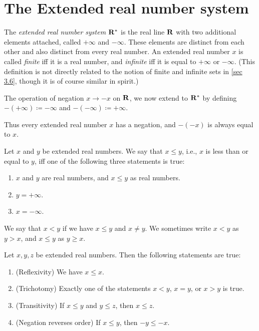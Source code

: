 \section{The Extended real number system}\label{sec 6.2}

\begin{definition}\label{6.2.1}
  The \emph{extended real number system \(\mathbf{R}^*\)} is the real line \(\mathbf{R}\) with two additional elements attached, called \(+\infty\) and \(-\infty\).
  These elements are distinct from each other and also distinct from every real number.
  An extended real number \(x\) is called \emph{finite} iff it is a real number, and \emph{infinite} iff it is equal to \(+\infty\) or \(-\infty\).
  (This definition is not directly related to the notion of finite and infinite sets in \cref{sec 3.6}, though it is of course similar in spirit.)
\end{definition}

\begin{definition}\label{6.2.2}
  The operation of negation \(x \to -x\) on \(\mathbf{R}\), we now extend to \(\mathbf{R}^*\) by defining \(-(+\infty) \coloneqq -\infty\) and \(-(-\infty) \coloneqq +\infty\).
\end{definition}

\begin{note}
  Thus every extended real number \(x\) has a negation, and \(-(-x)\) is always equal to \(x\).
\end{note}

\begin{definition}\label{6.2.3}
  Let \(x\) and \(y\) be extended real numbers.
  We say that \(x \leq y\), i.e., \(x\) is less than or equal to \(y\), iff one of the following three statements is true:
  \begin{enumerate}
    \item \(x\) and \(y\) are real numbers, and \(x \leq y\) as real numbers.
    \item \(y = +\infty\).
    \item \(x = -\infty\).
  \end{enumerate}
  We say that \(x < y\) if we have \(x \leq y\) and \(x \neq y\).
  We sometimes write \(x < y\) as \(y > x\), and \(x \leq y\) as \(y \geq x\).
\end{definition}

\setcounter{theorem}{4}
\begin{proposition}\label{6.2.5}
  Let \(x, y, z\) be extended real numbers.
  Then the following statements are true:
  \begin{enumerate}
    \item (Reflexivity)
          We have \(x \leq x\).
    \item (Trichotomy)
          Exactly one of the statements \(x < y\), \(x = y\), or \(x > y\) is true.
    \item (Transitivity)
          If \(x \leq y\) and \(y \leq z\), then \(x \leq z\).
    \item (Negation reverses order) If \(x \leq y\), then \(-y \leq -x\).
  \end{enumerate}
\end{proposition}

